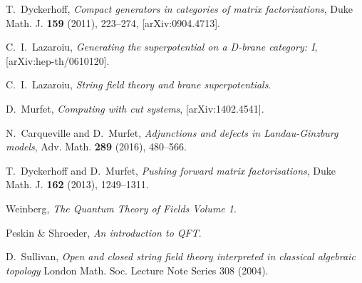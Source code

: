 \documentclass[english,letter paper,12pt,leqno]{article}
\theoremstyle{example}
\numberwithin{equation}{section}
\begin{document}

\providecommand{\bysame}{\leavevmode\hbox to3em{\hrulefill}\thinspace}
\providecommand{\href}[2]{#2}
\begin{thebibliography}{BHLS03}
  
T.~Dyckerhoff, \textsl{Compact generators in categories of matrix factorizations},
  Duke Math. J. \textbf{159} (2011), 223--274,
  \href{http://arxiv.org/abs/0904.4713}{[arXiv:0904.4713]}.
  
C.~I.~Lazaroiu, \textsl{Generating the superpotential on a D-brane category: I}, [arXiv:hep-th/0610120].

C.~I.~Lazaroiu, \textsl{String field theory and brane superpotentials}.
  
D.~Murfet, \textsl{Computing with cut systems}, \href{http://arxiv.org/abs/1402.4541}{[arXiv:1402.4541]}.

N.~Carqueville and D.~Murfet, \textsl{Adjunctions and defects in Landau-Ginzburg models}, Adv. Math. \textbf{289} (2016), 480--566.

T.~Dyckerhoff and D.~Murfet, \textsl{Pushing forward matrix factorisations}, Duke Math. J. \textbf{162} (2013), 1249--1311.

Weinberg, \textsl{The Quantum Theory of Fields Volume 1}.

Peskin \& Shroeder, \textsl{An introduction to QFT}.

D.~Sullivan, \textsl{Open and closed string field theory interpreted in classical algebraic topology} London Math. Soc. Lecture Note Series 308 (2004).

\end{thebibliography}
\end{document}
